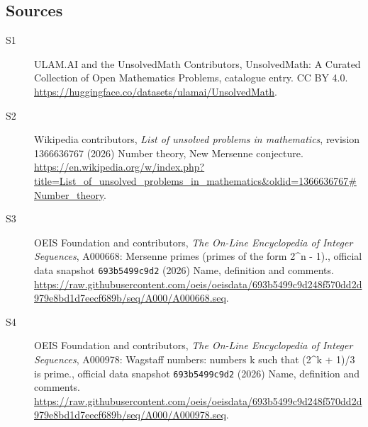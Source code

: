 \documentclass[11pt]{article}
\begin{document}
\subsection{Sources}
\begin{description}
\item[\hypertarget{source:statement:1}{S1}] ULAM.AI and the UnsolvedMath Contributors, UnsolvedMath: A Curated Collection of Open Mathematics Problems, catalogue entry. CC BY 4.0. \url{https://huggingface.co/datasets/ulamai/UnsolvedMath}.
\item[\hypertarget{source:statement:2}{S2}] Wikipedia contributors, \emph{List of unsolved problems in mathematics}, revision 1366636767 (2026) Number theory, New Mersenne conjecture. \url{https://en.wikipedia.org/w/index.php?title=List_of_unsolved_problems_in_mathematics&oldid=1366636767#Number_theory}.
\item[\hypertarget{source:statement:3}{S3}] OEIS Foundation and contributors, \emph{The On-Line Encyclopedia of Integer Sequences}, A000668: Mersenne primes (primes of the form 2\textasciicircum{}n - 1)., official data snapshot \texttt{693b5499c9d2} (2026) Name, definition and comments. \url{https://raw.githubusercontent.com/oeis/oeisdata/693b5499c9d248f570dd2d979e8bd1d7eecf689b/seq/A000/A000668.seq}.
\item[\hypertarget{source:statement:4}{S4}] OEIS Foundation and contributors, \emph{The On-Line Encyclopedia of Integer Sequences}, A000978: Wagstaff numbers: numbers k such that (2\textasciicircum{}k + 1)/3 is prime., official data snapshot \texttt{693b5499c9d2} (2026) Name, definition and comments. \url{https://raw.githubusercontent.com/oeis/oeisdata/693b5499c9d248f570dd2d979e8bd1d7eecf689b/seq/A000/A000978.seq}.
\end{description}
\label{end:statement}
\end{document}

